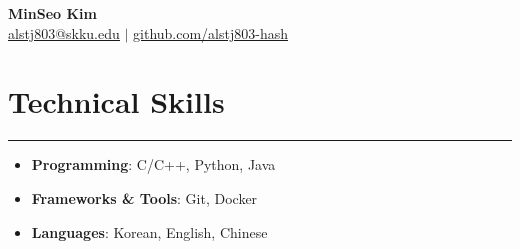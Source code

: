 \documentclass[letterpaper, 10pt]{article}
\begin{document}
\newcommand{\resumeItem}[1]{
  \item\small{
    {#1 \vspace{-6pt}}
  }
}

\begin{center}
\textbf{\LARGE MinSeo Kim} \\ \vspace{2pt}
\href{mailto:alstj803@skku.edu}{\underline{alstj803@skku.edu}} $|$
\href{https://github.com/alstj803-hash}{\underline{github.com/alstj803-hash}}
\end{center}
\section*{Technical Skills}
\hrule
\vspace{4pt}
\begin{itemize}
\item[] \textbf{Programming}: C/C++, Python, Java %
\item[] \textbf{Frameworks \& Tools}: Git, Docker%
\item[] \textbf{Languages}: Korean, English, Chinese %
\end{itemize}
\end{document}
